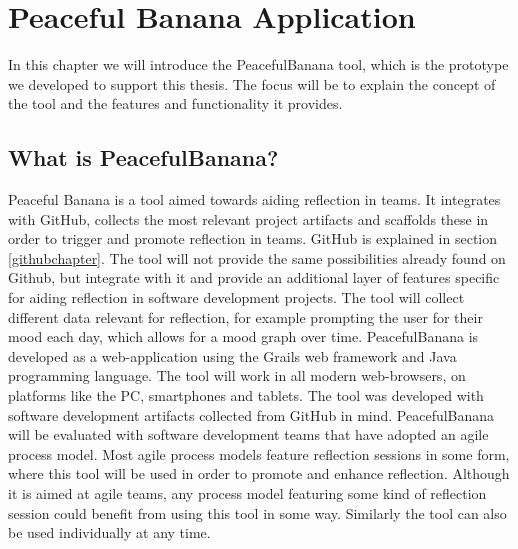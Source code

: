\chapter{Peaceful Banana Application}
\label{peacefulBananaApplication}
In this chapter we will introduce the PeacefulBanana tool, which is the prototype we developed to support this thesis. The focus will be to explain the concept of the tool and the features and functionality it provides. 

\section{What is PeacefulBanana?}
Peaceful Banana is a tool aimed towards aiding reflection in teams. It integrates with GitHub, collects the most relevant project artifacts and scaffolds these in order to trigger and promote reflection in teams. GitHub is explained in section \ref{githubchapter}. The tool will not provide the same possibilities already found on Github, but integrate with it and provide an additional layer of features specific for aiding reflection in software development projects. The tool will collect different data relevant for reflection, for example prompting the user for their mood each day, which allows for a mood graph over time. PeacefulBanana is developed as a web-application using the Grails web framework and Java programming language. The tool will work in all modern web-browsers, on platforms like the PC, smartphones and tablets. 
The tool was developed with software development artifacts collected from GitHub in mind. PeacefulBanana will be evaluated with software development teams that have adopted an agile process model. Most agile process models feature reflection sessions in some form, where this tool will be used in order to promote and enhance reflection. Although it is aimed at agile teams, any process model featuring some kind of reflection session could benefit from using this tool in some way. Similarly the tool can also be used individually at any time. 

